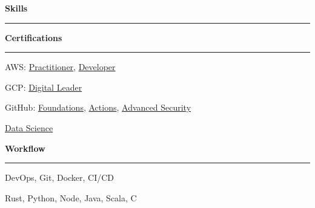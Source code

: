 \documentclass[11pt,letterpaper]{article}
\begin{document}
\begin{justify}
      {\Large \textbf{Skills}\strut}
      \hrule
      \begin{minipage}[t]{8.5cm}
            \textbf{Certifications}\strut
            \hrule
            \vspace{0.2cm}
            \begin{itemize}[label={}, leftmargin=0pt]
                  \begin{item}
                        AWS:
                        \href{https://www.credly.com/badges/33614ca6-2f0d-456b-87e9-bf8b8591cbf8/public_url}{Practitioner},
                        \href{https://www.credly.com/badges/e9b6c64c-2175-4345-950b-6331fd88af43/public_url}{Developer}
                  \end{item}
                  \begin{item}
                        GCP:
                        \href{https://www.credly.com/badges/0f158c45-adb0-4ac9-9d5f-0039649e4808/public_url}{Digital Leader}
                  \end{item}
                  \begin{item}
                        GitHub:
                        \href{https://www.credly.com/badges/0f59d53a-1ecb-4f6f-8a84-96fa3cb55965/public_url}{Foundations},
                        \href{https://www.credly.com/badges/6da40853-2bc6-4738-887e-8710a10e7a29/public_url}{Actions},
                        \href{https://www.credly.com/badges/b3c3ae21-61a9-4519-85d6-29a3bb8c443a/public_url}{Advanced Security}
                  \end{item}
                  \begin{item}
                        \href{https://dariocurr.github.io/assets/doc/data_science.pdf}{Data Science}
                  \end{item}
            \end{itemize}
      \end{minipage}
      \hfill
      \begin{minipage}[t]{6.6cm}
            \textbf{Workflow}\strut
            \hrule
            \vspace{0.2cm}
            \begin{itemize}[label={}, leftmargin=0pt]
                  \begin{item}
                        DevOps, Git, Docker, CI/CD
                  \end{item}
                  \begin{item}
                        Rust, Python, Node, Java, Scala, C
                  \end{item}

\end{itemize}
\end{minipage}
\end{justify}
\end{document}
